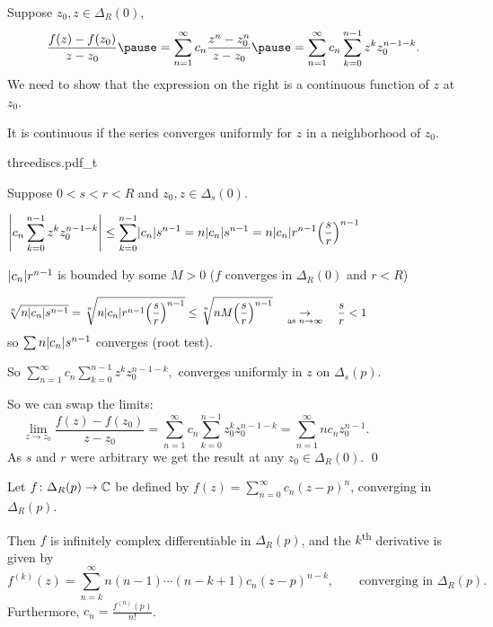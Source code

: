 \documentclass[10pt,aspectratio=169]{beamer}
\begin{document}
\begin{frame}

Suppose $z_0,z \in \Delta_R(0)$,
\[
\frac{f(z) - f(z_0)}{z-z_0}
\pause
=
\sum_{n=1}^\infty c_n \frac{z^n-z_0^n}{z-z_0}
\pause
=
\sum_{n=1}^\infty c_n \sum_{k=0}^{n-1} z^k z_0^{n-1-k} .
\]
\pause
We need to show that the expression on the right is a continuous
function of $z$ at $z_0$.

\pause

It is continuous if the series
converges uniformly for $z$ in a
neighborhood of $z_0$.

\pause

\hspace*{\fill}
{threediscs.pdf_t}

\vspace*{-1.47in}
Suppose $0 < s < r < R$ and $z_0,z \in \Delta_s(0)$.

\pause

\[
\left\lvert {c_n \sum_{k=0}^{n-1} z^k z_0^{n-1-k}} \right\rvert
\leq
\sum_{k=0}^{n-1} 
\lvert {c_n} \rvert s^{n-1}
=
n
\lvert {c_n} \rvert s^{n-1}
=
n
\lvert {c_n} \rvert r^{n-1} {\left(\frac{s}{r}\right)}^{n-1}
\qquad
\qquad
\qquad
\qquad
\]

\pause

$\lvert {c_n} \rvert r^{n-1}$ is bounded by some $M > 0$
($f$ converges in
$\Delta_{R}(0)$ and $r < R$)
\pause

\[
\sqrt[n]{
n \lvert {c_n} \rvert s^{n-1}
}
=
\sqrt[n]{
n \lvert {c_n} \rvert r^{n-1} {\left(\frac{s}{r}\right)}^{n-1}
}
\leq
\sqrt[n]{
n M {\left(\frac{s}{r}\right)}^{n-1}
}
\quad\underset{\text{as } n \to \infty}{\to}\quad
\frac{s}{r} < 1
\qquad
\qquad
\qquad
\qquad
\]
\pause
so
$\sum n \lvert {c_n} \rvert s^{n-1}$
converges (root test).

\pause

So
\(
\sum_{n=1}^\infty c_n \sum_{k=0}^{n-1} z^k z_0^{n-1-k} ,
\)
converges uniformly in $z$ on $\Delta_s(p)$.

\end{frame}

\begin{frame}

So we can swap the limits:
\[
\lim_{z \to z_0}
\frac{f(z)-f(z_0)}{z-z_0}
=
\sum_{n=1}^\infty c_n \sum_{k=0}^{n-1} z_0^k z_0^{n-1-k}
=
\sum_{n=1}^\infty n c_n z_0^{n-1} .
\qquad
\qquad
\qquad
\]
\pause
As $s$ and $r$ were arbitrary we get the result at any $z_0 \in \Delta_R(0)$.
\qed

\pause

\begin{corollary}
Let $f \colon \Delta_R(p) \to {\mathbb{C}}$ be defined by
\(\displaystyle
f(z) = \sum_{n=0}^\infty c_n {(z-p)}^n
\),
converging in $\Delta_R(p)$.

\pause
Then $f$ is infinitely complex differentiable in $\Delta_R(p)$,
and the $k$\textsuperscript{th} derivative is given by
\begin{equation*}
f^{(k)}(z) = \sum_{n=k}^\infty n(n-1)\cdots(n-k+1) c_n {(z-p)}^{n-k} ,
\qquad \text{converging in } \Delta_R(p) .
\end{equation*}
\pause
Furthermore,
\quad
$\displaystyle
c_n =
\frac{f^{(n)}(p)}{n!}
$.
\end{corollary}

\end{frame}
\end{document}
